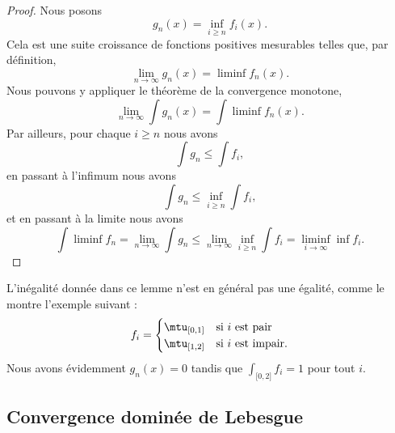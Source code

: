 \begin{proof}
    Nous posons 
    \begin{equation}
        g_n(x)=\inf_{i\geq n}f_i(x).
    \end{equation}
    Cela est une suite croissance de fonctions positives mesurables telles que, par définition, 
    \begin{equation}
        \lim_{n\to \infty}g_n(x)=\liminf f_n(x).
    \end{equation}
    Nous pouvons y appliquer le théorème de la convergence monotone,
    \begin{equation}
        \lim_{n\to \infty} \int g_n(x)=\int\liminf f_n(x).
    \end{equation}
    Par ailleurs, pour chaque \( i\geq n\) nous avons
    \begin{equation}
        \int g_n\leq \int f_i,
    \end{equation}
    en passant à l'infimum nous avons
    \begin{equation}
        \int g_n\leq \inf_{i\geq n}\int f_i,
    \end{equation}
    et en passant à la limite nous avons
    \begin{equation}
        \int\liminf f_n=\lim_{n\to \infty} \int g_n\leq \lim_{n\to \infty} \inf_{i\geq n}\int f_i=\liminf_{i\to\infty}\inf f_i.
    \end{equation}
\end{proof}

L'inégalité donnée dans ce lemme n'est en général pas une égalité, comme le montre l'exemple suivant :
\begin{equation}
    f_i=\begin{cases}
        \mtu_{\mathopen[ 0 , 1 \mathclose]}    &   \text{si \( i\) est pair}\\
        \mtu_{\mathopen[ 1 , 2 \mathclose]}    &    \text{si \( i\) est impair}.
    \end{cases}
\end{equation}
Nous avons évidemment \( g_n(x)=0\) tandis que \( \int_{\mathopen[ 0 , 2 \mathclose]}f_i=1\) pour tout \( i\).

\subsection{Convergence dominée de Lebesgue}

